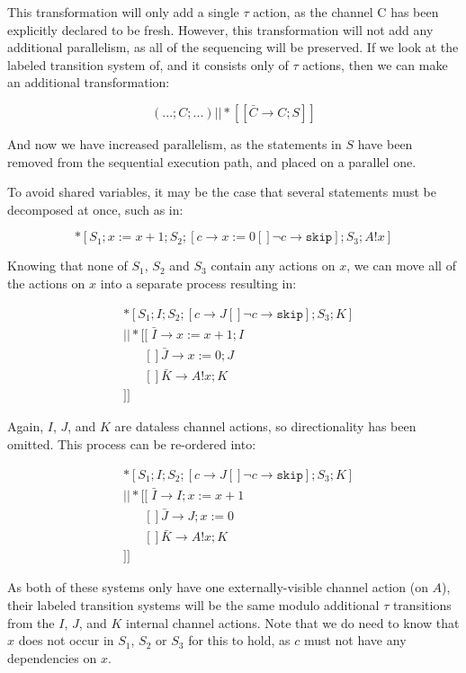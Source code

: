 \documentclass[times, 10pt]{article}
\begin{document}
This transformation will only add a single $\tau$ action, as the channel C has
been explicitly declared to be fresh.  However, this transformation will not add
any additional parallelism, as all of the sequencing will be preserved. If we
look at the labeled transition system of, and it consists only of $\tau$
actions, then we can make an additional transformation:

\[
(...;C;...) || *[[\bar{C} \rightarrow C; S]]
\]

And now we have increased parallelism, as the statements in $S$ have been
removed from the sequential execution path, and placed on a parallel one.

To avoid shared variables, it may be the case that several statements must be
decomposed at once, such as in:

\[
*[S_1; x := x + 1; S_2; [ c \rightarrow x := 0 [] \lnot c \rightarrow \texttt{skip} ]; S_3; A!x ] 
\]

Knowing that none of $S_1$, $S_2$ and $S_3$ contain any actions on $x$, we can
move all of the actions on $x$ into a separate process resulting in:

\begin{align*}
& *[S_1; I; S_2; [ c \rightarrow J [] \lnot c \rightarrow \texttt{skip} ]; S_3; K] \\
& || *[[\;\bar{I} \rightarrow x := x + 1; I \\
&\;\;\;\;\;\;[] \bar{J} \rightarrow x := 0; J \\
&\;\;\;\;\;\;[] \bar{K} \rightarrow  A!x; K \\
&]]
\end{align*}

Again, $I$, $J$, and $K$ are dataless channel actions, so directionality has
been omitted. This process can be re-ordered into:

\begin{align*}
& *[S_1; I; S_2; [ c \rightarrow J [] \lnot c \rightarrow \texttt{skip} ]; S_3; K] \\
& || *[[\;\bar{I} \rightarrow I; x := x + 1 \\
&\;\;\;\;\;\;[] \bar{J} \rightarrow J; x := 0 \\
&\;\;\;\;\;\;[] \bar{K} \rightarrow  A!x; K \\
&]]
\end{align*}

As both of these systems only have one externally-visible channel action (on
$A$), their labeled transition systems will be the same modulo additional $\tau$
transitions from the $I$, $J$, and $K$ internal channel actions. Note that we do
need to know that $x$ does not occur in $S_1$, $S_2$ or $S_3$ for this to hold,
as $c$ must not have any dependencies on $x$.
\end{document}
